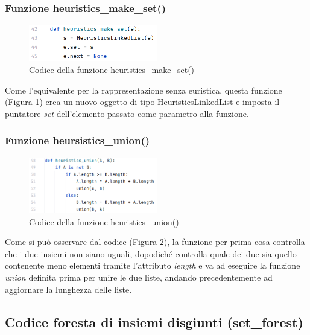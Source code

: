 \documentclass[12pt]{article}
\begin{document}
\subsubsection{Funzione heuristics\_make\_set()}
\begin{figure}[h]
    \centering
    \includegraphics[width=0.5\textwidth]{images/linked_list_code_images/llh_make_set.png}
    \caption{Codice della funzione heuristics\_make\_set()}
    \label{fig:llh_make_set}
\end{figure}
Come l'equivalente per la rappresentazione senza euristica, questa funzione (Figura \ref{fig:llh_make_set}) crea un nuovo oggetto di tipo HeuristicsLinkedList e imposta il puntatore \textit{set} dell'elemento passato come parametro alla funzione.

\subsubsection{Funzione heursistics\_union()}
\begin{figure}[h]
    \centering
    \includegraphics[width=0.5\textwidth]{images/linked_list_code_images/llh_union.png}
    \caption{Codice della funzione heuristics\_union()}
    \label{fig:llh_union}
\end{figure}
Come si può osservare dal codice (Figura \ref{fig:llh_union}), la funzione per prima cosa controlla che i due insiemi non siano uguali, dopodiché controlla quale dei due sia quello contenente meno elementi tramite l'attributo \textit{length} e va ad eseguire la funzione \textit{union} definita prima per unire le due liste, andando precedentemente ad aggiornare la lunghezza delle liste.

\subsection{Codice foresta di insiemi disgiunti (set\_forest)}
\end{document}
